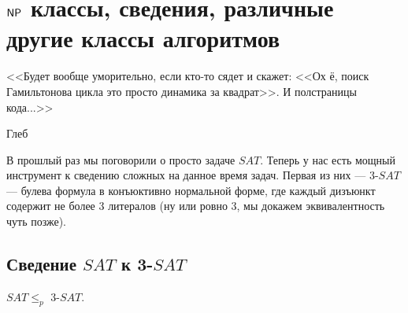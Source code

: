 \documentclass[a4paper, 12pt]{article}
\begin{document}
\pagestyle{fancy}

\section{$\mathsf{NP}$ классы, сведения, различные другие классы алгоритмов}

\epigraph{<<Будет вообще уморительно, если кто-то сядет и скажет: <<Ох ё,
поиск Гамильтонова цикла это просто динамика за квадрат>>. И полстраницы кода...>>}
{Глеб}

В прошлый раз мы поговорили о просто задаче $SAT$. Теперь у нас есть мощный
инструмент к сведению сложных на данное время задач. Первая из них ---
3-$SAT$ --- булева формула в конъюктивно нормальной форме, где каждый дизъюнкт
содержит не более 3 литералов (ну или ровно 3, мы докажем эквивалентность чуть
позже).

\subsection{Сведение $SAT$ к 3-$SAT$}

\begin{Theorem}
  $SAT \leqslant_p$ 3-$SAT$.
\end{Theorem}
\end{document}
